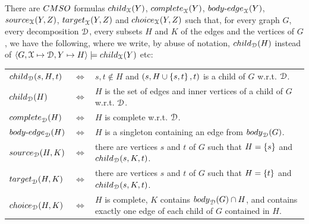 \begin{proposition}
There are $\CMSO$ formulas $\mathsf{child}_\cX(Y)$, $\mathsf{complete}_\cX(Y)$, $\mathsf{body\text{-}edge}_\cX(Y)$, $\mathsf{source}_\cX(Y,Z)$, $\mathsf{target}_\cX(Y,Z)$ and $\mathsf{choice}_\cX(Y,Z)$ such that, for every graph $G$, every decomposition $\mathcal D$, every subsets $H$ and $K$ of the edges and the vertices of $G$, we have the following, where  we write, by abuse of notation, $\mathsf{child}_\cD(H)$ instead of $\langle G, \cX\mapsto \cD, Y\mapsto H\rangle\models \mathsf{child}_\cX(Y)$ etc:\\
\noindent \begin{flushleft}
\begin{tabular}{llp{10cm}} 
$ \mathsf{child}_\cD(s,H,t)$&$\Leftrightarrow$& $s, t\notin H$ and $(s,H\cup\left\{s,t\right\},t)$ is a child of $G$ w.r.t.  $\mathcal D$.\\[10pt]
$\mathsf{child}_\cD(H)$&$\Leftrightarrow$& $H$ is the set of edges and inner vertices of a child of $G$ w.r.t.  $\mathcal D$.\\[10pt]
 $ \mathsf{complete}_\cD(H)$ &$\Leftrightarrow$&  $H$ is complete w.r.t. $\mathcal D$.\\[10pt]
 $\mathsf{body\text{-}edge}_\cD(H)$&$\Leftrightarrow$& $H$ is a singleton containing an edge from  $\mathsf{body}_\cD(G)$.\\[10pt]
 $ \mathsf{source}_\cD(H,K)$&$\Leftrightarrow$& there are vertices  $ s$ and $t$ of $G$ such that $H=\left\{s\right\}$  and   $\mathsf{child}_\cD(s,K,t)$.\\[10pt]
 
 $\mathsf{target}_\cD(H,K)$&$\Leftrightarrow$ &there are vertices  $ s$ and $t$ of $G$ such that $H=\left\{t\right\}$  and   $\mathsf{child}_\cD(s,K,t)$.\\[10pt]
  $\mathsf{choice}_\cD(H,K)$&$\Leftrightarrow$ & $H$ is complete,  $K$ contains $\mathsf{body}_\cD(G)\cap H$, and contains exactly one edge of each  child of $G$  contained in $H$.
\end{tabular}
\end{flushleft}
\end{proposition}


